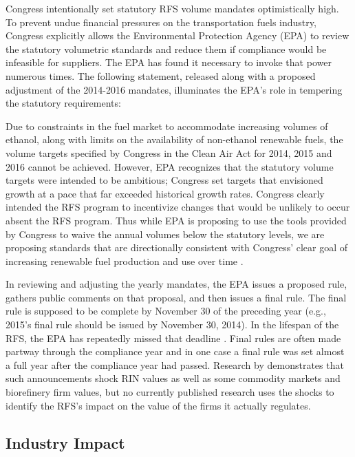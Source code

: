 \documentclass[11pt]{article}
\begin{document}
Congress intentionally set statutory RFS volume mandates optimistically high. To prevent undue financial pressures on the transportation fuels industry, Congress explicitly allows the Environmental Protection Agency (EPA) to review the statutory volumetric standards and reduce them if compliance would be infeasible for suppliers. The EPA has found it necessary to invoke that power numerous times. The following statement, released along with a proposed adjustment of the 2014-2016 mandates, illuminates the EPA's role in tempering the statutory requirements:

\begin{displayquote}
	Due to constraints in the fuel market to accommodate increasing volumes of ethanol, along with limits on the availability of non-ethanol renewable fuels, the volume targets specified by Congress in the Clean Air Act for 2014, 2015 and 2016 cannot be achieved. However, EPA recognizes that the statutory volume targets were intended to be ambitious; Congress set targets that envisioned growth at a pace that far exceeded historical growth rates. Congress clearly intended the RFS program to incentivize changes that would be unlikely to occur absent the RFS program. Thus while EPA is proposing to use the tools provided by Congress to waive the annual volumes below the statutory levels, we are proposing standards that are directionally consistent with Congress' clear goal of increasing renewable fuel production and use over time \citep{EnvironmentalProtectionAgency2015}.
\end{displayquote}

In reviewing and adjusting the yearly mandates, the EPA issues a proposed rule, gathers public comments on that proposal, and then issues a final rule. The final rule is supposed to be complete by November 30 of the preceding year (e.g., 2015's final rule should be issued by November 30, 2014). In the lifespan of the RFS, the EPA has repeatedly missed that deadline \citep{Bracmort2015}. Final rules are often made partway through the compliance year and in one case a final rule was set almost a full year after the compliance year had passed. Research by \cite{Lade2018a} demonstrates that such announcements shock RIN values as well as some commodity markets and biorefinery firm values, but no currently published research uses the shocks to identify the RFS's impact on the value of the firms it actually regulates.

\subsection{Industry Impact}
\end{document}
